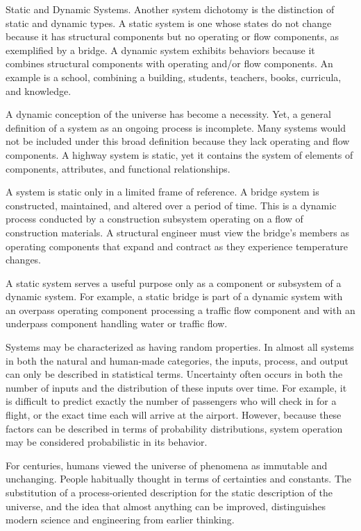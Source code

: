 Static and Dynamic Systems.  Another system dichotomy is the distinction of static and dynamic types. A static system is one whose states do not change because it has structural components but no operating or flow components, as exemplified by a bridge. A dynamic system exhibits behaviors because it combines structural components with operating and/or flow components. An example is a school, combining a building, students, teachers, books, curricula, and knowledge.

A dynamic conception of the universe has become a necessity. Yet, a general definition of a system as an ongoing process is incomplete. Many systems would not be included under this broad definition because they lack operating and flow components. A highway system is static, yet it contains the system of elements of components, attributes, and functional relationships.

A system is static only in a limited frame of reference. A bridge system is constructed, maintained, and altered over a period of time. This is a dynamic process conducted by a construction subsystem operating on a flow of construction materials. A structural engineer must view the bridge’s members as operating components that expand and contract as they experience temperature changes.

A static system serves a useful purpose only as a component or subsystem of a dynamic system. For example, a static bridge is part of a dynamic system with an overpass operating component processing a traffic flow component and with an underpass component handling water or traffic flow.

Systems may be characterized as having random properties. In almost all systems in both the natural and human-made categories, the inputs, process, and output can only be described in statistical terms. Uncertainty often occurs in both the number of inputs and the distribution of these inputs over time. For example, it is difficult to predict exactly the number of passengers who will check in for a flight, or the exact time each will arrive at the airport. However, because these factors can be described in terms of probability distributions, system operation may be considered probabilistic in its behavior.

For centuries, humans viewed the universe of phenomena as immutable and unchanging. People habitually thought in terms of certainties and constants. The substitution of a process-oriented description for the static description of the universe, and the idea that almost anything can be improved, distinguishes modern science and engineering from earlier thinking.

